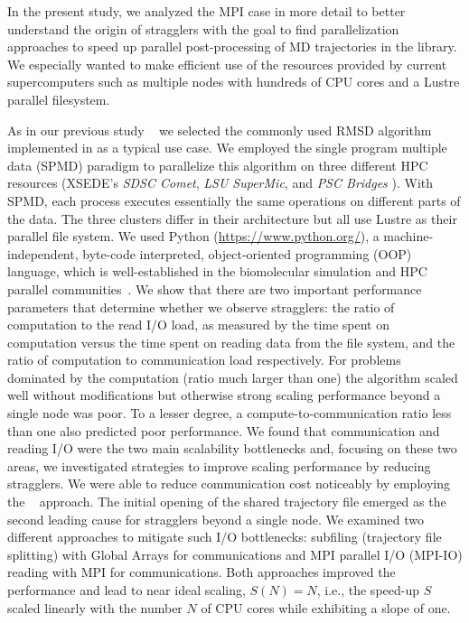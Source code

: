 In the present study, we analyzed the MPI case in more detail to better understand the origin of stragglers with the goal to find  parallelization approaches to speed up parallel post-processing of MD trajectories in the  library.
We especially wanted to make efficient use of the resources provided by current supercomputers such as multiple nodes with hundreds of CPU cores and a Lustre parallel filesystem.

As in our previous study ~\cite{Khoshlessan:2017ab} we selected the commonly used RMSD algorithm implemented in  as a typical use case.
We employed the single program multiple data (SPMD) paradigm to parallelize this algorithm on three different HPC resources (XSEDE's \emph{SDSC Comet}, \emph{LSU SuperMic}, and \emph{PSC Bridges} \cite{xsede}).
With SPMD, each process executes essentially the same operations on different parts of the data.
The three clusters differ in their architecture but all use Lustre as their parallel file system.
We used Python (\url{https://www.python.org/}), a machine-independent, byte-code interpreted, object-oriented programming (OOP) language, which is well-established in the biomolecular simulation and HPC parallel communities~\cite{Dalcin:2011aa, GAiN}. 
We show that there are two important performance parameters that determine whether we observe stragglers: the ratio of computation to the read I/O load, as measured by the time spent on computation versus the time spent on reading data from the file system, and the ratio of computation to communication load respectively.
For problems dominated by the computation (ratio much larger than one) the algorithm scaled well without modifications but otherwise strong scaling performance beyond a single node was poor.
To a lesser degree, a compute-to-communication ratio less than one also predicted poor performance.
We found that communication and reading I/O were the two main scalability bottlenecks and, focusing on these two areas, we investigated strategies to improve scaling performance by reducing stragglers. 
We were able to reduce communication cost noticeably by employing the ~\cite{GA, GAiN} approach.
The initial opening of the shared trajectory file emerged as the second leading cause for stragglers beyond a single node.
We examined two different approaches to mitigate such I/O bottlenecks: subfiling (trajectory file splitting) with Global Arrays for communications and MPI parallel I/O (MPI-IO) reading with MPI for communications.
Both approaches improved the performance and lead to near ideal scaling, $S(N) = N$, i.e., the speed-up $S$ scaled linearly with the number $N$ of CPU cores while exhibiting a slope of one.

